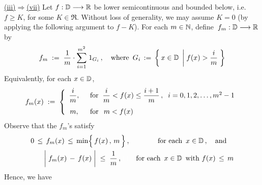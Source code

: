 \vskip 0.5cm \noindent
\underline{(iii)\;$\Longrightarrow$\;(vii)}
\vskip 0.2cm \noindent
Let $f : \mathbb{D} \longrightarrow \mathbb{R}$ be lower semicontinuous and bounded below,
i.e. $f \geq K$, for some $K \in \Re$.
Without loss of generality, we may assume $K = 0$ (by applying the following argument to $f - K$).
For each $m \in \mathbb{N}$, define \,$f_{m} : \mathbb{D} \longrightarrow \mathbb{R}$ by
\begin{equation*}
f_{m} \; := \; \dfrac{1}{m} \cdot \overset{m^{2}}{\underset{i=1}{\sum}} \; 1_{G_{i}}\,,
\quad
\textnormal{where \,$G_{i} \,:=\, \left\{\,x\in\mathbb{D}\;\left\vert\; f(x) > \dfrac{i}{m}\right.\,\right\}$}
\end{equation*}
Equivalently, for each $x \in \mathbb{D}$,
\begin{equation*}
f_{m}(x) \; := \;
\left\{\begin{array}{cl}
\dfrac{i}{m}, & \;\;\textnormal{for}\;\; \dfrac{i}{m} < f(x) \leq \dfrac{i+1}{m}\,, \;\;\textnormal{$i = 0, 1, 2, \ldots, m^{2}-1$}
\\
m, & \;\;\textnormal{for} \;\;\, m < \overset{{\color{white}\vert}}{f}(x)
\end{array}\right.
\end{equation*}
Observe that the $f_{m}$'s satisfy
\begin{eqnarray*}
0 \,\leq\, f_{m}(x) \,\leq\, \min\!\left\{\,\overset{{\color{white}.}}{f}(x)\,,\,m\,\right\},
&& \textnormal{for each \,$x \in \D$}\,,
\quad\textnormal{and}\quad
\\
\left\vert\;f_{m}(x)\,\overset{{\color{white}-}}{-}\,f(x)\;\right\vert \;\leq\; \dfrac{1}{m}\,,{\color{white}11}
&& \textnormal{for each \,$x \in \D$\, with $f(x) \,\leq\, m$}
\end{eqnarray*}
Hence, we have
